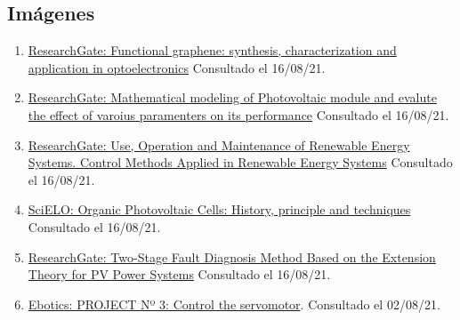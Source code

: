 \documentclass[12pt]{article}
\begin{document}
		\subsection*{Imágenes}
		
			\begin{enumerate}
				
				\item 
				\label{bib: research gate JV curve solar panel}
				\href{https://www.researchgate.net/figure/J-V-characteristic-of-a-typical-solar-cell-in-the-dark-dashed-line-and-under_fig37_283662836}{ResearchGate: Functional graphene: synthesis, characterization and application in optoelectronics} Consultado el 16/08/21.
				
				\item 
				\label{bib: research gate pv cell param}
				\href{https://www.researchgate.net/figure/I-V-characteristics-curve-of-a-PV-cell_fig2_313450163}{ResearchGate: Mathematical modeling of Photovoltaic module and evalute the effect of varoius paramenters on its performance}	Consultado el 16/08/21.	
				
				\item
				\label{bib: research gate mppt curve} \href{https://www.researchgate.net/figure/Characteristic-curves-of-MPPT-a-power-voltage-curve-and-b-current-voltage-curve_fig7_278728718}{ResearchGate: Use, Operation and Maintenance of Renewable Energy Systems. Control Methods Applied in Renewable Energy Systems} Consultado el 16/08/21.
							
				\item 
				\label{bib: SciELO}
				\href{https://www.scielo.cl/scielo.php?script=sci_arttext\&pid=S0717-97072008000300001}{SciELO: Organic Photovoltaic Cells: History, principle and techniques} Consultado el 16/08/21.
				
				\item 
				\label{bib: research gate pv power}
				\href{https://www.researchgate.net/figure/The-I-V-characteristic-curve-of-solar-cells-under-different-temperature_fig1_258388008}{ResearchGate: Two-Stage Fault Diagnosis Method Based on the Extension Theory for PV Power Systems} Consultado el 16/08/21.
				
				\item
				\label{ebotics servo parts}
				\href{https://ebotics.com/activity/project-no-3-control-the-servomotor/}{Ebotics: PROJECT Nº 3: Control the servomotor}. Consultado el 02/08/21.
				

\end{enumerate}
\end{document}
